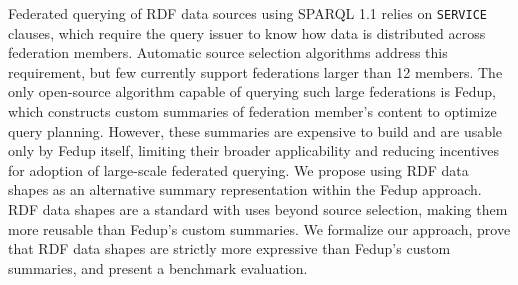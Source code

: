 Federated querying of RDF data sources using SPARQL 1.1 relies on \texttt{SERVICE} clauses,
which require the query issuer to know how data is distributed across federation members.
Automatic source selection algorithms address this requirement,
but few currently support federations larger than 12 members.
The only open-source algorithm capable of querying such large federations is Fedup,
which constructs custom summaries of federation member's content to optimize query planning.
However, these summaries are expensive to build and are usable only by Fedup itself,
limiting their broader applicability and reducing incentives for adoption of large-scale federated querying.
We propose using RDF data shapes as an alternative summary representation within the Fedup approach.
RDF data shapes are a standard with uses beyond source selection,
making them more reusable than Fedup's custom summaries.
We formalize our approach, prove that RDF data shapes are strictly more expressive
than Fedup's custom summaries, and present a benchmark evaluation.
